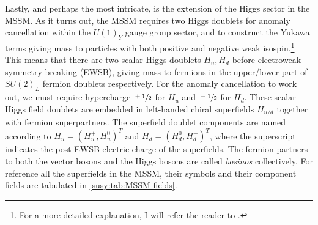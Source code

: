 \documentclass[../main.tex]{subfiles}
\begin{document}
Lastly, and perhaps the most intricate, is the extension of the Higgs sector in the MSSM.
As it turns out, the MSSM requires two Higgs doublets for anomaly cancellation within the \(U(1)_Y\) gauge group sector, and to construct the Yukawa terms giving mass to particles with both positive and negative weak isospin.\footnote{For a more detailed explanation, I will refer the reader to \cite{Martin:1997ns}.}
This means that there are two scalar Higgs doublets \(H_u, H_d\) before electroweak symmetry breaking (EWSB), giving mass to fermions in the upper/lower part of \(SU(2)_L\) fermion doublets respectively.
For the anomaly cancellation to work out, we must require hypercharge \(\sfrac{+1}{2}\) for \(H_u\) and \(\sfrac{-1}{2}\) for \(H_d\).
These scalar Higgs field doublets are embedded in left-handed chiral superfields \(H_{u/d}\) together with fermion superpartners.
The superfield doublet components are named according to \(H_u = (H_u^+, H_u^0)^T\) and \(H_d = (H_d^0, H_d^-)^T\), where the superscript indicates the post EWSB electric charge of the superfields.
The fermion partners to both the vector bosons and the Higgs bosons are called \emph{bosinos} collectively.
For reference all the superfields in the MSSM, their symbols and their component fields are tabulated in \cref{susy:tab:MSSM-fields}.
\end{document}
